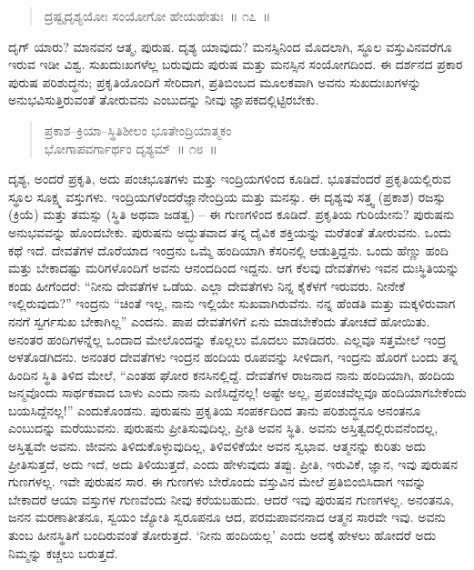 \begin{verse}
ದ್ರಷ್ಟೃದೃಶ್ಯಯೋಃ ಸಂಯೋಗೋ ಹೇಯಹೇತುಃ~॥ ೧೭~॥
\end{verse}

\vspace{-0.4cm}


\vskip 0.2cm

ದೃಗ್​ ಯಾರು? ಮಾನವನ ಆತ್ಮ, ಪುರುಷ. ದೃಶ್ಯ ಯಾವುದು? ಮನಸ್ಸಿನಿಂದ ಮೊದಲಾಗಿ, ಸ್ಥೂಲ ವಸ್ತುವಿನವರೆಗೂ ಇರುವ ಇಡೀ ವಿಶ್ವ. ಸುಖದುಃಖಗಳೆಲ್ಲ ಬರುವುದು ಪುರುಷ ಮತ್ತು ಮನಸ್ಸಿನ ಸಂಯೋಗದಿಂದ. ಈ ದರ್ಶನದ ಪ್ರಕಾರ ಪುರುಷ ಪರಿಶುದ್ಧನು; ಪ್ರಕೃತಿಯೊಂದಿಗೆ ಸೇರಿದಾಗ, ಪ್ರತಿಬಿಂಬದ ಮೂಲಕವಾಗಿ ಅವನು ಸುಖದುಃಖಗಳನ್ನು ಅನುಭವಿಸುತ್ತಿರುವಂತೆ ತೋರುವನು ಎಂಬುದನ್ನು ನೀವು ಜ್ಞಾಪಕದಲ್ಲಿಟ್ಟಿರಬೇಕು. 

\vspace{-0.2cm}

\begin{verse}
ಪ್ರಕಾಶ–ಕ್ರಿಯಾ–ಸ್ಥಿತಿಶೀಲಂ ಭೂತೇಂದ್ರಿಯಾತ್ಮಕಂ\\ ಭೋಗಾಪವರ್ಗಾರ್ಥಂ ದೃಶ್ಯಮ್​~॥ ೧೮~॥
\end{verse}

\vspace{-0.4cm}


\vskip 0.2cm

ದೃಶ್ಯ, ಅಂದರೆ ಪ್ರಕೃತಿ, ಅದು ಪಂಚಭೂತಗಳು ಮತ್ತು ಇಂದ್ರಿಯಗಳಿಂದ ಕೂಡಿದೆ. ಭೂತವೆಂದರೆ ಪ್ರಕೃತಿಯಲ್ಲಿರುವ ಸ್ಥೂಲ ಸೂಕ್ಷ್ಮ ವಸ್ತುಗಳು. ಇಂದ್ರಿಯಗಳೆಂದರೆ\break ಜ್ಞಾನೇಂದ್ರಿಯ ಮತ್ತು ಮನಸ್ಸು. ಈ ದೃಶ್ಯವು ಸತ್ತ್ವ (ಪ್ರಕಾಶ) ರಜಸ್ಸು (ಕ್ರಿಯೆ) ಮತ್ತು ತಮಸ್ಸು (ಸ್ಥಿತಿ ಅಥವಾ ಜಡತ್ವ) – ಈ ಗುಣಗಳಿಂದ ಕೂಡಿದೆ. ಪ್ರಕೃತಿಯ ಗುರಿಯೇನು? ಪುರುಷನು ಅನುಭವವನ್ನು ಹೊಂದಬೇಕು. ಪುರುಷನು ಅದ್ಭುತವಾದ ತನ್ನ ದೈವಿಕ ಶಕ್ತಿಯನ್ನು ಮರೆತಂತೆ ತೋರುವನು. ಒಂದು ಕಥೆ ಇದೆ. ದೇವತೆಗಳ ದೊರೆಯಾದ ಇಂದ್ರನು ಒಮ್ಮೆ ಹಂದಿಯಾಗಿ ಕೆಸರಿನಲ್ಲಿ ಆಡುತ್ತಿದ್ದನು. ಒಂದು ಹೆಣ್ಣು ಹಂದಿ ಮತ್ತು ಬೇಕಾದಷ್ಟು ಮರಿಗಳೊಂದಿಗೆ ಅವನು ಆನಂದದಿಂದ ಇದ್ದನು. ಆಗ ಕೆಲವು ದೇವತೆಗಳು ಇವನ ದುಃಸ್ಥಿತಿಯನ್ನು ಕಂಡು ಹೀಗೆಂದರೆ: “ನೀನು ದೇವತೆಗಳ ಒಡೆಯ. ಎಲ್ಲಾ ದೇವತೆಗಳು ನಿನ್ನ ಕೈಕೆಳಗೆ ಇರುವರು. ನೀನೇಕೆ ಇಲ್ಲಿರುವುದು?” ಇಂದ್ರನು “ಚಿಂತೆ ಇಲ್ಲ, ನಾನು ಇಲ್ಲಿಯೇ ಸುಖ\break ವಾಗಿರುವೆನು. ನನ್ನ ಹೆಂಡತಿ ಮತ್ತು ಮಕ್ಕಳಿರುವಾಗ ನನಗೆ ಸ್ವರ್ಗಸುಖ ಬೇಕಾಗಿಲ್ಲ” ಎಂದನು. ಪಾಪ ದೇವತೆಗಳಿಗೆ ಏನು ಮಾಡಬೇಕೆಂದು ತೋಚದೆ ಹೋಯಿತು. ಅನಂತರ ಹಂದಿಗಳನ್ನೆಲ್ಲ ಒಂದಾದ ಮೇಲೊಂದನ್ನು ಕೊಲ್ಲಲು ಮೊದಲು ಮಾಡಿದರು. ಎಲ್ಲವೂ ಸತ್ತಮೇಲೆ ಇಂದ್ರ ಅಳತೊಡಗಿದನು. ಅನಂತರ ದೇವತೆಗಳು ಇಂದ್ರನ ಹಂದಿಯ ರೂಪವನ್ನು ಸೀಳಿದಾಗ, ಇಂದ್ರನು ಹೊರಗೆ ಬಂದು ತನ್ನ ಹಿಂದಿನ ಸ್ಥಿತಿ ತಿಳಿದ ಮೇಲೆ, “ಎಂತಹ ಘೋರ ಕನಸಿನಲ್ಲಿದ್ದೆ. ದೇವತೆಗಳ ರಾಜನಾದ ನಾನು ಹಂದಿಯಾಗಿ, ಹಂದಿಯ ಜನ್ಮವೊಂದು ಸಾರ್ಥಕವಾದ ಬಾಳು ಎಂದು ನಾನು ಎಣಿಸಿದ್ದೆನಲ್ಲ! ಅಷ್ಟೇ ಅಲ್ಲ, ಪ್ರಪಂಚವೆಲ್ಲವೂ ಹಂದಿಯಾಗಬೇಕೆಂದು ಬಯಸಿದ್ದೆನಲ್ಲ!” ಎಂದುಕೊಂಡನು. ಪುರುಷನು ಪ್ರಕೃತಿಯ ಸಂಪರ್ಕದಿಂದ ತಾನು ಪರಿಶುದ್ಧನೂ ಅನಂತನೂ ಎಂಬುದನ್ನು ಮರೆಯುವನು. ಪುರುಷನು ಪ್ರೀತಿಸುವುದಿಲ್ಲ, ಪ್ರೀತಿ ಅವನ ಸ್ಥಿತಿ. ಅವನು ಅಸ್ತಿತ್ವದಲ್ಲಿರುವನೆಂದಲ್ಲ, ಅಸ್ತಿತ್ವವೇ ಅವನು. ಜೀವನು ತಿಳಿದುಕೊಳ್ಳುವುದಿಲ್ಲ, ತಿಳಿವಳಿಕೆಯೇ ಅವನ ಸ್ವಭಾವ. ಆತ್ಮನನ್ನು ಕುರಿತು ಅದು ಪ್ರೀತಿಸುತ್ತದೆ, ಅದು ಇದೆ, ಅದು ತಿಳಿಯುತ್ತದೆ, ಎಂದು ಹೇಳುವುದು ತಪ್ಪು. ಪ್ರೀತಿ, ಇರುವಿಕೆ, ಜ್ಞಾನ, ಇವು ಪುರುಷನ ಗುಣಗಳಲ್ಲ. ಇವೇ ಪುರುಷನ ಸಾರ. ಈ ಗುಣಗಳು ಬೇರೊಂದು ವಸ್ತುವಿನ ಮೇಲೆ ಪ್ರತಿಬಿಂಬಿಸಿದಾಗ ಇವನ್ನು ಬೇಕಾದರೆ ಆಯಾ ವಸ್ತುಗಳ ಗುಣವೆಂದು ನೀವು ಕರೆಯಬಹುದು. ಆದರೆ ಇವು ಪುರುಷನ ಗುಣಗಳಲ್ಲ. ಅನಂತನೂ, ಜನನ ಮರಣಾತೀತನೂ, ಸ್ವಯಂ ಜ್ಯೋತಿ ಸ್ವರೂಪನೂ ಆದ, ಪರಮಪಾವನನಾದ ಆತ್ಮನ ಸಾರವೇ ಇವು. ಅವನು ತುಂಬ ಹೀನಸ್ಥಿತಿಗೆ ಬಂದಿರುವಂತೆ ತೋರುತ್ತದೆ. ‘ನೀನು ಹಂದಿಯಲ್ಲ’ ಎಂದು ಅದಕ್ಕೆ ಹೇಳಲು ಹೋದರೆ ಅದು ನಿಮ್ಮನ್ನು ಕಚ್ಚಲು ಬರುತ್ತದೆ. 


